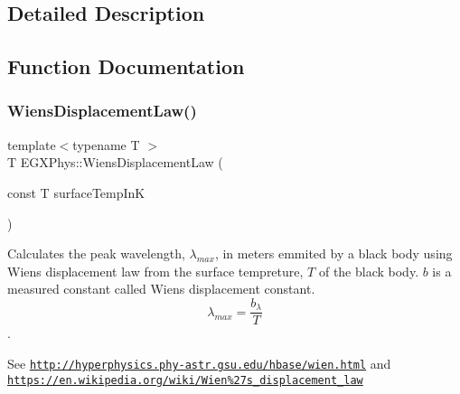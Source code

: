 \subsection{Detailed Description}


\subsection{Function Documentation}
\mbox{\label{group___e_g_x_phys-_electrodynamics-_black_body-_wiens_displacement_law_ga8f89ce1baac45a1717f604255d04af44}} 
\subsubsection{\texorpdfstring{Wiens\+Displacement\+Law()}{WiensDisplacementLaw()}}
{\footnotesize\ttfamily template$<$typename T $>$ \\
T E\+G\+X\+Phys\+::\+Wiens\+Displacement\+Law (\begin{DoxyParamCaption}\item[{const T}]{surface\+Temp\+InK }\end{DoxyParamCaption})}



Calculates the peak wavelength, $\lambda_{max}$, in meters emmited by a black body using Wien\textquotesingle{}s displacement law from the surface tempreture, $T$ of the black body. $b$ is a measured constant called Wien\textquotesingle{}s displacement constant. \[\lambda_{max} = \dfrac{b_\lambda}{T} \]. 

See \href{http://hyperphysics.phy-astr.gsu.edu/hbase/wien.html}{\tt http\+://hyperphysics.\+phy-\/astr.\+gsu.\+edu/hbase/wien.\+html} and \href{https://en.wikipedia.org/wiki/Wien%27s_displacement_law}{\tt https\+://en.\+wikipedia.\+org/wiki/\+Wien\%27s\+\_\+displacement\+\_\+law}



